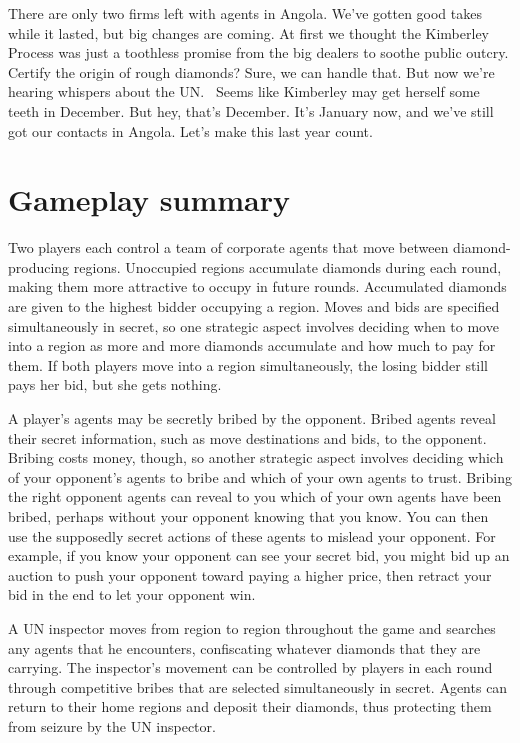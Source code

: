 There are only two firms left with agents in Angola.  We've gotten good takes while it lasted, but big changes are coming.  At first we thought the Kimberley Process was just a toothless promise from the big dealers to soothe public outcry.  Certify the origin of rough diamonds?  Sure, we can handle that.  But now we're hearing whispers about the UN. \ Seems like Kimberley may get herself some teeth in December.  But hey, that's December.  It's January now, and we've still got our contacts in Angola.  Let's make this last year count.


\section{Gameplay summary}

Two players each control a team of corporate agents that move between diamond-producing regions.  Unoccupied regions accumulate diamonds during each round, making them more attractive to occupy in future rounds.  Accumulated diamonds are given to the highest bidder occupying a region.  Moves and bids are specified simultaneously in secret, so one strategic aspect involves deciding when to move into a region as more and more diamonds accumulate and how much to pay for them.  If both players move into a region simultaneously, the losing bidder still pays her bid, but she gets nothing.

A player's agents may be secretly bribed by the opponent.  Bribed agents reveal their secret information, such as move destinations and bids, to the opponent.  Bribing costs money, though, so another strategic aspect involves deciding which of your opponent's agents to bribe and which of your own agents to trust.  Bribing the right opponent agents can reveal to you which of your own agents have been bribed, perhaps without your opponent knowing that you know.  You can then use the supposedly secret actions of these agents to mislead your opponent.  For example, if you know your opponent can see your secret bid, you might bid up an auction to push your opponent toward paying a higher price, then retract your bid in the end to let your opponent win.

A UN inspector moves from region to region throughout the game and searches any agents that he encounters, confiscating whatever diamonds that they are carrying.  The inspector's movement can be controlled by players in each round through competitive bribes that are selected simultaneously in secret.  Agents can return to their home regions and deposit their diamonds, thus protecting them from seizure by the UN inspector.

